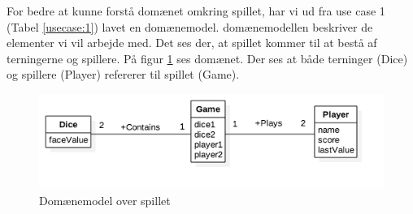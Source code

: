 For bedre at kunne forstå domænet omkring spillet, har vi ud fra use case 1 (Tabel \ref{usecase:1}) lavet en domænemodel. domænemodellen beskriver de elementer vi vil arbejde med.
Det ses der, at spillet kommer til at bestå af terningerne og spillere.
På figur \ref{fig:domaenemodel} ses domænet.
Der ses at både terninger (Dice) og spillere (Player) refererer til spillet (Game).

\begin{figure}[h]
    \begin{center}
        \includegraphics[width=15cm]{graphics/Domaenemodel}
        \caption{Domænemodel over spillet}
        \label{fig:domaenemodel}
    \end{center}
\end{figure}